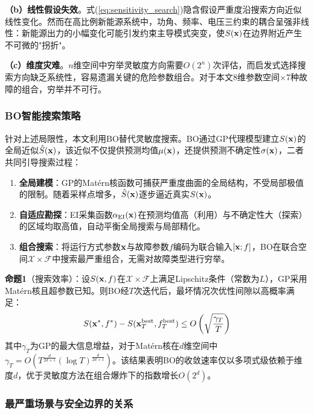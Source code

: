 \textbf{（b）线性假设失效}。式(\ref{eq:sensitivity_search})隐含假设严重度沿搜索方向近似线性变化。然而在高比例新能源系统中，功角、频率、电压三约束的耦合呈强非线性：新能源出力的小幅变化可能引发约束主导模式突变，使$S(\mathbf{x})$在边界附近产生不可微的"拐折"。

\textbf{（c）维度灾难}。$n$维空间中穷举灵敏度方向需要$O(2^n)$次评估，而启发式选择搜索方向缺乏系统性，容易遗漏关键的危险参数组合。对于本文8维参数空间$\times$7种故障的组合，穷举并不可行。

\subsubsection{BO智能搜索策略}

针对上述局限性，本文利用BO替代灵敏度搜索。BO通过GP代理模型建立$S(\mathbf{x})$的全局近似$\hat{S}(\mathbf{x})$，该近似不仅提供预测均值$\mu(\mathbf{x})$，还提供预测不确定性$\sigma(\mathbf{x})$，二者共同引导搜索过程：

\begin{enumerate}
    \item \textbf{全局建模}：GP的Matérn核函数可捕获严重度曲面的全局结构，不受局部极值的限制。随着采样点增多，$\hat{S}(\mathbf{x})$逐步逼近真实$S(\mathbf{x})$。

    \item \textbf{自适应勘探}：EI采集函数$\alpha_{\text{EI}}(\mathbf{x})$在预测均值高（利用）与不确定性大（探索）的区域均取高值，自动平衡全局搜索与局部精化。

    \item \textbf{组合搜索}：将运行方式参数$\mathbf{x}$与故障参数$f$编码为联合输入$[\mathbf{x}; f]$，BO在联合空间$\mathcal{X} \times \mathcal{F}$中搜索最严重组合，无需对故障类型进行穷举。
\end{enumerate}

\textbf{命题1}（搜索效率）：设$S(\mathbf{x}, f)$在$\mathcal{X} \times \mathcal{F}$上满足Lipschitz条件（常数为$L$），GP采用Matérn核且超参数已知。则BO经$T$次迭代后，最坏情况次优性间隙以高概率满足：
\begin{equation}
    S(\mathbf{x}^*, f^*) - S(\mathbf{x}_T^{\text{best}}, f_T^{\text{best}}) \leq O\left(\sqrt{\frac{\gamma_T}{T}}\right)
    \label{eq:bo_bound}
\end{equation}
其中$\gamma_T$为GP的最大信息增益，对于Matérn核在$d$维空间中$\gamma_T = O\left(T^{\frac{d}{2d+1}} (\log T)^{\frac{d}{2d+1}}\right)$\cite{srinivas2010gp_ucb, frazier2018bo_tutorial}。该结果表明BO的收敛速率仅以多项式级依赖于维度$d$，优于灵敏度方法在组合爆炸下的指数增长$O(2^d)$。

\subsubsection{最严重场景与安全边界的关系}

